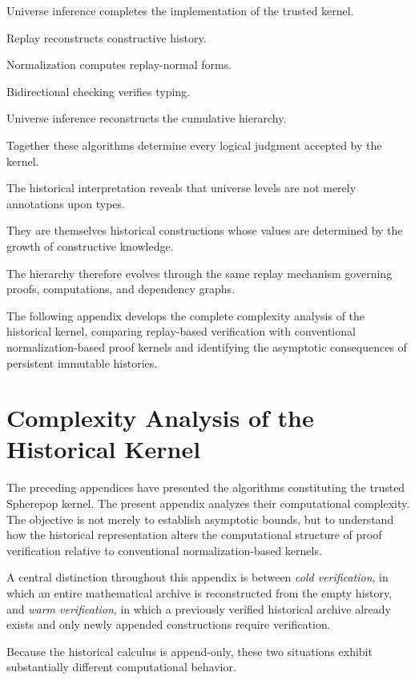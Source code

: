 \documentclass[12pt,oneside]{article}
\theoremstyle{definition}
\theoremstyle{remark}
\begin{document}
Universe inference completes the implementation of the trusted kernel.

Replay reconstructs constructive history.

Normalization computes replay-normal forms.

Bidirectional checking verifies typing.

Universe inference reconstructs the cumulative hierarchy.

Together these algorithms determine every logical judgment accepted by the
kernel.

The historical interpretation reveals that universe levels are not merely
annotations upon types.

They are themselves historical constructions whose values are determined by the
growth of constructive knowledge.

The hierarchy therefore evolves through the same replay mechanism governing
proofs, computations, and dependency graphs.

The following appendix develops the complete complexity analysis of the
historical kernel, comparing replay-based verification with conventional
normalization-based proof kernels and identifying the asymptotic consequences of
persistent immutable histories.

\section{Complexity Analysis of the Historical Kernel}

The preceding appendices have presented the algorithms constituting the trusted
Spherepop kernel. The present appendix analyzes their computational complexity.
The objective is not merely to establish asymptotic bounds, but to understand
how the historical representation alters the computational structure of proof
verification relative to conventional normalization-based kernels.

A central distinction throughout this appendix is between \emph{cold
verification}, in which an entire mathematical archive is reconstructed from the
empty history, and \emph{warm verification}, in which a previously verified
historical archive already exists and only newly appended constructions require
verification.

Because the historical calculus is append-only, these two situations exhibit
substantially different computational behavior.
\end{document}
